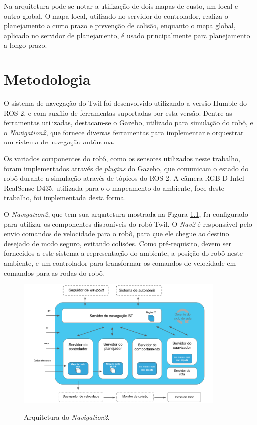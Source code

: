 \documentclass[repeatfields,xlists,xpacks,oneside,yearsonly]{ufrgscca}
\begin{document}
Na arquitetura pode-se notar a utilização de dois mapas de custo, um
local e outro global. O mapa local, utilizado no servidor do
controlador, realiza o planejamento a curto prazo e prevenção de
colisão, enquanto o mapa global, aplicado no servidor de
planejamento, é usado principalmente para planejamento a longo prazo.

\chapter{Metodologia}
\label{desenvolvimento}

O sistema de navegação do Twil foi desenvolvido utilizando a versão
Humble do ROS 2, e com auxílio de ferramentas suportadas por esta
versão. Dentre as ferramentas utilizadas, destacam-se o Gazebo,
utilizado para simulação do robô, e o \textit{Navigation2}, que
fornece diversas ferramentas para implementar e orquestrar um sistema
de navegação autônoma.

Os variados componentes do robô, como os sensores utilizados neste
trabalho, foram implementados através de \textit{plugins} do Gazebo,
que comunicam o estado do robô durante a simulação através de tópicos
do ROS 2. A câmera RGB-D Intel RealSense D435, utilizada para o o
mapeamento do ambiente, foco deste trabalho, foi implementada desta
forma.

O \textit{Navigation2}, que tem sua arquitetura mostrada na Figura
\ref{fig:nav2_arc}, foi configurado para utilizar os componentes
disponíveis do robô Twil. O \textit{Nav2} é responsável pelo envio
comandos de velocidade para o robô, para que ele chegue ao destino
desejado de modo seguro, evitando colisões. Como pré-requisito, devem
ser fornecidos a este sistema a representação do ambiente, a posição
do robô neste ambiente, e um controlador para transformar os comandos
de velocidade em comandos para as rodas do robô.

\begin{figure}[h]
    {
        \centering
        \caption{Arquitetura do \textit{Navigation2}.}
        \label{fig:nav2_arc}
        \includegraphics[width=0.9\textwidth]{nav2_architecture_trad.png}\\
    }
    {} %
\end{figure}
\end{document}
